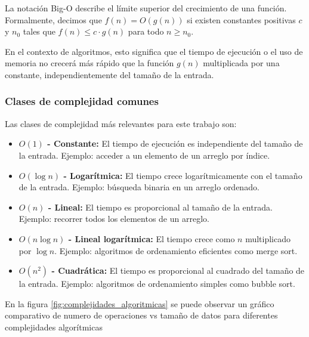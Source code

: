 \documentclass[12pt,a4paper]{article}
\begin{document}
La notación Big-O describe el límite superior del crecimiento de una función. Formalmente, decimos que $f(n) = O(g(n))$ si existen constantes positivas $c$ y $n_0$ tales que $f(n) \leq c \cdot g(n)$ para todo $n \geq n_0$.

En el contexto de algoritmos, esto significa que el tiempo de ejecución o el uso de memoria no crecerá más rápido que la función $g(n)$ multiplicada por una constante, independientemente del tamaño de la entrada.

\subsubsection{Clases de complejidad comunes}

Las clases de complejidad más relevantes para este trabajo son:

\begin{itemize}
    \item \textbf{$O(1)$ - Constante:} El tiempo de ejecución es independiente del tamaño de la entrada. Ejemplo: acceder a un elemento de un arreglo por índice.
    
    \item \textbf{$O(\log n)$ - Logarítmica:} El tiempo crece logarítmicamente con el tamaño de la entrada. Ejemplo: búsqueda binaria en un arreglo ordenado.
    
    \item \textbf{$O(n)$ - Lineal:} El tiempo es proporcional al tamaño de la entrada. Ejemplo: recorrer todos los elementos de un arreglo.
    
    \item \textbf{$O(n \log n)$ - Lineal logarítmica:} El tiempo crece como $n$ multiplicado por $\log n$. Ejemplo: algoritmos de ordenamiento eficientes como merge sort.
    
    \item \textbf{$O(n^2)$ - Cuadrática:} El tiempo es proporcional al cuadrado del tamaño de la entrada. Ejemplo: algoritmos de ordenamiento simples como bubble sort.
\end{itemize}

En la figura \ref{fig:complejidades_algoritmicas} se puede observar un gráfico comparativo de numero de operaciones vs tamaño de datos para diferentes complejidades algorítmicas
\end{document}
